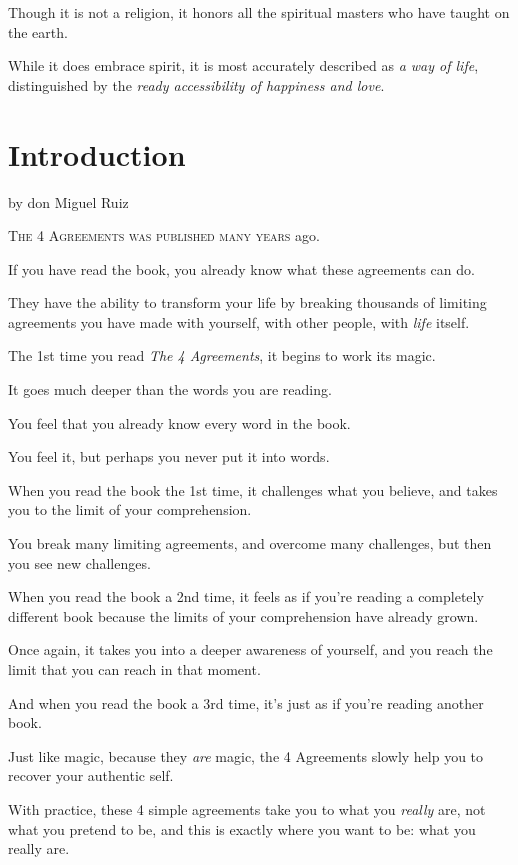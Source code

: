 \documentclass{article}
\numberwithin{equation}{section}
\begin{document}
Though it is not a religion, it honors all the spiritual masters who have taught on the earth.

While it does embrace spirit, it is most accurately described as \textit{a way of life}, distinguished by the \textit{ready accessibility of happiness and love}.


\section*{Introduction}
\begin{center}
    \large by don Miguel Ruiz
\end{center}
\textsc{The 4 Agreements was published many years} ago.

If you have read the book, you already know what these agreements can do.

They have the ability to transform your life by breaking thousands of limiting agreements you have made with yourself, with other people, with \textit{life} itself.

%
The 1st time you read \textit{The 4 Agreements}, it begins to work its magic.

It goes much deeper than the words you are reading.

You feel that you already know every word in the book.

You feel it, but perhaps you never put it into words.

When you read the book the 1st time, it challenges what you believe, and takes you to the limit of your comprehension.

You break many limiting agreements, and overcome many challenges, but then you see new challenges.

When you read the book a 2nd time, it feels as if you're reading a completely different book because the limits of your comprehension have already grown.

Once again, it takes you into a deeper awareness of yourself, and you reach the limit that you can reach in that moment.

And when you read the book a 3rd time, it's just as if you're reading another book.

%
Just like magic, because they \textit{are} magic, the 4 Agreements slowly help you to recover your authentic self.

With practice, these 4 simple agreements take you to what you \textit{really} are, not what you pretend to be, and this is exactly where you want to be: what you really are.
\end{document}
